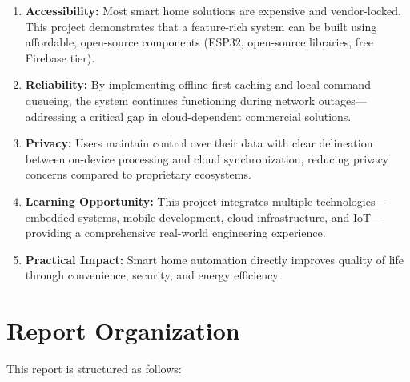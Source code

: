 \begin{enumerate}
    \item \textbf{Accessibility:} Most smart home solutions are expensive and vendor-locked. This project demonstrates that a feature-rich system can be built using affordable, open-source components (ESP32, open-source libraries, free Firebase tier).
    
    \item \textbf{Reliability:} By implementing offline-first caching and local command queueing, the system continues functioning during network outages—addressing a critical gap in cloud-dependent commercial solutions.
    
    \item \textbf{Privacy:} Users maintain control over their data with clear delineation between on-device processing and cloud synchronization, reducing privacy concerns compared to proprietary ecosystems.
    
    \item \textbf{Learning Opportunity:} This project integrates multiple technologies—embedded systems, mobile development, cloud infrastructure, and IoT—providing a comprehensive real-world engineering experience.
    
    \item \textbf{Practical Impact:} Smart home automation directly improves quality of life through convenience, security, and energy efficiency.
\end{enumerate}

\section{Report Organization}

This report is structured as follows:

